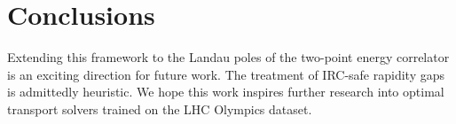 \section{Conclusions}\label{sec:conclusions}

Extending this framework to the Landau poles of the two-point energy
correlator is an exciting direction for future work. The treatment of
IRC-safe rapidity gaps is admittedly heuristic. We hope this work
inspires further research into optimal transport solvers trained on the
LHC Olympics dataset.

